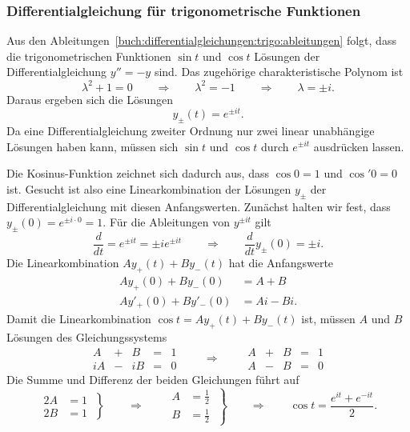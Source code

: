 %
%
\subsubsection{Differentialgleichung für trigonometrische Funktionen}
%
Aus den Ableitungen~\eqref{buch:differentialgleichungen:trigo:ableitungen}
folgt, dass die trigonometrischen Funktionen $\sin t $ und $\cos t$
Lösungen der Differentialgleichung $y''=-y$ sind.
Das zugehörige charakteristische Polynom ist 
%
\[
\lambda^2+1=0
\qquad\Rightarrow\qquad
\lambda^2=-1
\qquad\Rightarrow\qquad
\lambda=\pm i.
\]
Daraus ergeben sich die Lösungen
\[
y_{\pm}(t) = e^{\pm i t}.
\]
Da eine Differentialgleichung zweiter Ordnung nur zwei linear unabhängige
Lösungen haben kann, müssen sich $\sin t$ und $\cos t$ durch
$e^{\pm it}$ ausdrücken lassen.

Die Kosinus-Funktion zeichnet sich dadurch aus, dass $\cos 0=1$ und
$\cos' 0=0$ ist.
Gesucht ist also eine Linearkombination der Lösungen
$y_{\pm}$ der Differentialgleichung mit diesen Anfangswerten.
Zunächst halten wir fest, dass $y_{\pm}(0)=e^{\pm i\cdot 0}=1$.
Für die Ableitungen von $y^{\pm it}$ gilt
\[
\frac{d}{dt}
=
e^{\pm i t}
=
\pm ie^{\pm i t}
\qquad\Rightarrow\qquad
\frac{d}{dt}y_{\pm}(0) = \pm i.
\]
Die Linearkombination $Ay_+(t)+By_-(t)$ hat die Anfangswerte
\begin{align*}
Ay_+(0)+By_-(0)&=A+B\\
Ay'_+(0)+By'_-(0)&=Ai-Bi.
\end{align*}
Damit die Linearkombination $\cos t=Ay_+(t)+By_-(t)$ ist, müssen
$A$ und $B$ Lösungen des Gleichungssystems
\[
\renewcommand\arraycolsep{2pt}
\begin{array}{rcrcr}
 A&+& B&=&1\\
iA&-&iB&=&0
\end{array}
\qquad\Rightarrow\qquad
\begin{array}{rcrcr}
 A&+& B&=&1\\
 A&-& B&=&0
\end{array}
\]
Die Summe und Differenz der beiden Gleichungen führt auf
\[
\left.
\begin{aligned}
2A&=1\\
2B&=1
\end{aligned}
\;
\right\}
\qquad\Rightarrow\qquad
\left.
\begin{aligned}
A&=\textstyle\frac12\\
B&=\textstyle\frac12
\end{aligned}
\;
\right\}
\qquad\Rightarrow\qquad
\cos t = \frac{e^{it}+e^{-it}}{2}.
\]

